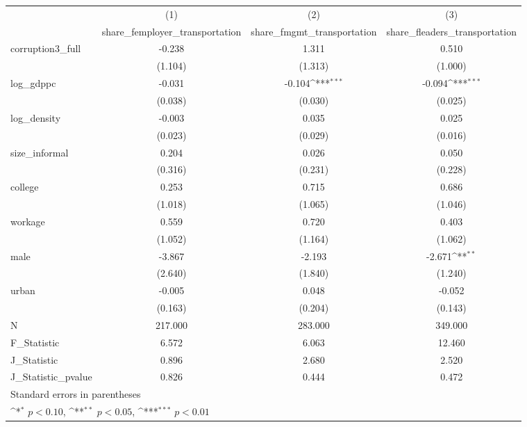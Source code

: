 {
\def\sym#1{\ifmmode^{#1}\else\(^{#1}\)\fi}
\begin{tabular}{l*{3}{c}}
\hline\hline
            &\multicolumn{1}{c}{(1)}&\multicolumn{1}{c}{(2)}&\multicolumn{1}{c}{(3)}\\
            &\multicolumn{1}{c}{share\_femployer\_transportation}&\multicolumn{1}{c}{share\_fmgmt\_transportation}&\multicolumn{1}{c}{share\_fleaders\_transportation}\\
\hline
corruption3\_full&      -0.238         &       1.311         &       0.510         \\
            &     (1.104)         &     (1.313)         &     (1.000)         \\
[1em]
log\_gdppc   &      -0.031         &      -0.104\sym{***}&      -0.094\sym{***}\\
            &     (0.038)         &     (0.030)         &     (0.025)         \\
[1em]
log\_density &      -0.003         &       0.035         &       0.025         \\
            &     (0.023)         &     (0.029)         &     (0.016)         \\
[1em]
size\_informal&       0.204         &       0.026         &       0.050         \\
            &     (0.316)         &     (0.231)         &     (0.228)         \\
[1em]
college     &       0.253         &       0.715         &       0.686         \\
            &     (1.018)         &     (1.065)         &     (1.046)         \\
[1em]
workage     &       0.559         &       0.720         &       0.403         \\
            &     (1.052)         &     (1.164)         &     (1.062)         \\
[1em]
male        &      -3.867         &      -2.193         &      -2.671\sym{**} \\
            &     (2.640)         &     (1.840)         &     (1.240)         \\
[1em]
urban       &      -0.005         &       0.048         &      -0.052         \\
            &     (0.163)         &     (0.204)         &     (0.143)         \\
\hline
N           &     217.000         &     283.000         &     349.000         \\
F\_Statistic &       6.572         &       6.063         &      12.460         \\
J\_Statistic &       0.896         &       2.680         &       2.520         \\
J\_Statistic\_pvalue&       0.826         &       0.444         &       0.472         \\
\hline\hline
\multicolumn{4}{l}{\footnotesize Standard errors in parentheses}\\
\multicolumn{4}{l}{\footnotesize \sym{*} \(p<0.10\), \sym{**} \(p<0.05\), \sym{***} \(p<0.01\)}\\
\end{tabular}
}
